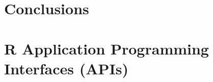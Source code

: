 \section{Conclusions}


\section{R Application Programming Interfaces (APIs)}





\begin{thebibliography}{00}

\end{thebibliography}


